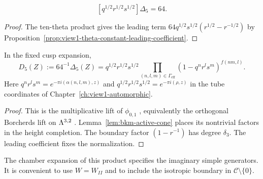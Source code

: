 \begin{lemma}
\label{lem:bkm-vacuum-coefficient}
\begin{equation}
\label{eq:bkm-vacuum-coefficient}
 [q^{1/2}r^{1/2}s^{1/2}]\Delta_5=64.
\end{equation}
\end{lemma}
\begin{proof}
The ten-theta product gives the leading term
$64q^{1/2}s^{1/2}(r^{1/2}-r^{-1/2})$ by
Proposition~\ref{prop:view1-theta-constant-leading-coefficient}.
\end{proof}

\begin{theorem}
\label{thm:bkm-borcherds-product-D5}
In the fixed cusp expansion,
\begin{equation}
\label{eq:bkm-D5-borcherds-product}
 D_5(Z):=64^{-1}\Delta_5(Z)
 =q^{1/2}r^{1/2}s^{1/2}
   \prod_{(n,l,m)\in\Gamma_{\mathrm{eff}}}(1-q^nr^ls^m)^{f(nm,l)}.
\end{equation}
Here $q^nr^ls^m=e^{-\pi i(\alpha(n,l,m),z)}$ and
$q^{1/2}r^{1/2}s^{1/2}=e^{-\pi i(\rho,z)}$ in the tube
coordinates of Chapter~\ref{ch:view1-automorphic}.
\end{theorem}
\begin{proof}
This is the multiplicative lift of $\phi_{0,1}$
\cite[Theorem~2.1 and Example~2.4]{GNII}, equivalently the
orthogonal Borcherds lift on $\Lambda^{3,2}$
\cite[Theorem~13.3]{B}. Lemma~\ref{lem:bkm-active-cone} places
its nontrivial factors in the height completion. The boundary factor
$(1-r^{-1})$ has degree $\delta_3$. The leading coefficient fixes
the normalization.
\end{proof}

The chamber expansion of this product specifies the imaginary
simple generators. It is convenient to use $W=W_{II}$ and to include
the isotropic boundary in $\mathcal C\setminus\{0\}$.

